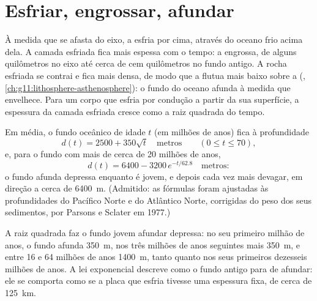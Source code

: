 \section{Esfriar, engrossar, afundar}

À medida que se afasta do eixo, a  esfria por cima, através do
oceano frio acima dela. A camada esfriada fica mais espessa com o tempo: a
 engrossa, de alguns quilômetros no eixo até cerca de cem
quilômetros no fundo antigo. A rocha esfriada se contrai e fica mais densa,
de modo que a  flutua mais baixo sobre a  (,
\cref{ch:g11:lithosphere-asthenosphere}): o fundo do oceano afunda à medida
que envelhece. Para um corpo que esfria por condução a partir da sua
superfície, a espessura da camada esfriada cresce como a raiz quadrada do
tempo.

\begin{proposition}\label{prop:g11:ocean-ridges:depth-age}
Em média, o fundo oceânico de idade $t$ (em milhões de anos) fica à profundidade
\[
  d(t) = 2500 + 350\sqrt{t} \quad \text{metros} \qquad (0 \le t \le 70),
\]
e, para o fundo com mais de cerca de 20 milhões de anos,
\[
  d(t) = 6400 - 3200\,e^{-t/62.8} \quad \text{metros}:
\]
o fundo afunda depressa enquanto é jovem, e depois cada vez mais devagar, em
direção a cerca de \qty{6400}{m}. (Admitido: as fórmulas foram ajustadas às
profundidades do Pacífico Norte e do Atlântico Norte, corrigidas do peso dos
seus sedimentos, por Parsons e Sclater em 1977.)
\end{proposition}

A raiz quadrada faz o fundo jovem afundar depressa: no seu primeiro milhão
de anos, o fundo afunda \qty{350}{m}, nos três milhões de anos seguintes
mais \qty{350}{m}, e entre 16 e 64 milhões de anos \qty{1400}{m}, tanto
quanto nos seus primeiros dezesseis milhões de anos. A lei exponencial
descreve como o fundo antigo para de afundar: ele se comporta como se a
placa que esfria tivesse uma espessura fixa, de cerca de \qty{125}{km}.

